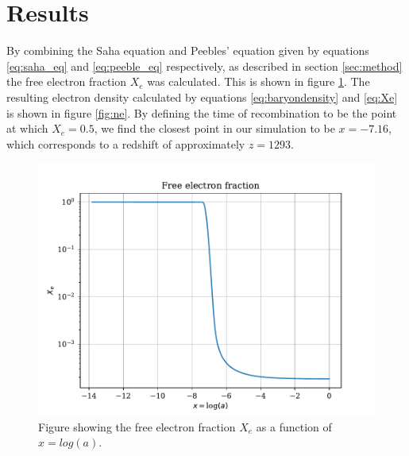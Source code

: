 \documentclass[onecolumn]{aastex62}
\begin{document}
\section{Results}
\label{sec:results}
By combining the Saha equation and Peebles' equation given by equations \ref{eq:saha_eq} and \ref{eq:peeble_eq} respectively, as described in section \ref{sec:method} the free electron fraction $X_e$ was calculated. This is shown in figure \ref{fig:xe}. The resulting electron density calculated by equations \ref{eq:baryondensity} and \ref{eq:Xe} is shown in figure \ref{fig:ne}. By defining the time of recombination to be the point at which $X_e=0.5$, we find the closest point in our simulation to be $x=-7.16$, which corresponds to a redshift of approximately $z=1293$.
\begin{figure}
    \includegraphics[scale=0.8]{figures/xe.pdf}
    \caption{Figure showing the free electron fraction $X_e$ as a function of $x=log(a)$.}
    \label{fig:xe}
\end{figure}
\end{document}

